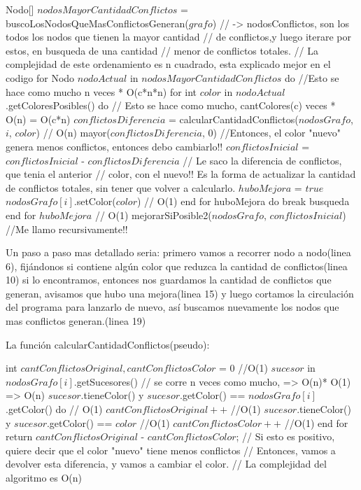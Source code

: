 \begin{codebox}
	\li	Nodo[] $nodosMayorCantidadConflictos$ = buscoLosNodosQueMasConflictosGeneran($grafo$) 
	\li 	// -> nodosConflictos, son los todos los nodos que tienen la mayor cantidad
	\li 	//  de conflictos,y luego iterare por estos, en busqueda de una cantidad 
	\li 		//  menor de conflictos totales.
	\li 		//  La complejidad de este ordenamiento es n cuadrado, esta explicado mejor en el codigo
	\li	for Nodo $nodoActual$ in $nodosMayorCantidadConflictos$ do 
	\li 		//Esto se hace como mucho n veces * O(c*n*n)
	\li		for int $color$ in $nodoActual$.getColoresPosibles() do  
	\li 			// Esto se hace como mucho, cantColores(c) veces * O(n) = O(c*n)
	\li			$conflictosDiferencia$ = calcularCantidadConflictos($nodosGrafo$, $i$, $color$) // O(n) 
	\li			\If mayor($conflictosDiferencia$, $0$)
	\li 				//Entonces, el color "nuevo" genera menos conflictos, entonces debo cambiarlo!!
	\li				\Then	$conflictosInicial$ = $conflictosInicial$ - $conflictosDiferencia$ // Le saco la diferencia de conflictos, que tenia el anterior
	\li 						// color, con el nuevo!! Es la forma de actualizar la cantidad de conflictos totales, sin tener que volver a calcularlo.
	\li						$huboMejora$ = $true$
	\li						$nodosGrafo[i]$.setColor($color$) // O(1)
				\End
	\li 		end for
	\li		\If huboMejora do
	\li			\Then	break busqueda
			\End
	\li 		end for
	\li	\If $huboMejora$  // O(1)
	\li		\Then	mejorarSiPosible2($nodosGrafo$, $conflictosInicial$) //Me llamo recursivamente!! 
		\End
\end{codebox}

Un paso a paso mas detallado seria: primero vamos a recorrer nodo a nodo(linea 6), fijándonos si contiene algún color que reduzca la cantidad
de conflictos(linea 10) si lo encontramos, entonces nos guardamos la cantidad de conflictos que generan, avisamos que hubo una mejora(linea 15)
y luego cortamos la circulación del programa para lanzarlo de nuevo, así buscamos nuevamente los nodos que mas conflictos generan.(linea 19)


La función calcularCantidadConflictos(pseudo):

\begin{codebox}
	\li int $cantConflictosOriginal, cantConflictosColor$ = $0$ //O(1)
	\li 	\For $sucesor$ in  $nodosGrafo[i]$.getSucesores() \do  // se corre n veces como mucho, => O(n)* O(1) => O(n)
	\li 		\If $sucesor$.tieneColor() y $sucesor$.getColor() == $nodosGrafo[i]$.getColor() do // O(1)
	\li 			\Then	$cantConflictosOriginal++$ //O(1)
	 		\End
	\li  	\If $sucesor$.tieneColor() y $sucesor$.getColor() == $color$ //O(1)
	\li 			\Then	$cantConflictosColor++$  //O(1)
			\End
	\li	end for
	\li	return $cantConflictosOriginal$ - $cantConflictosColor$;	// Si esto es positivo, quiere decir que el color "nuevo" tiene menos conflictos
	\li 		// Entonces, vamos a devolver esta diferencia, y vamos a cambiar el color.
	\li 		// La complejidad del algoritmo es O(n)
\end{codebox}

